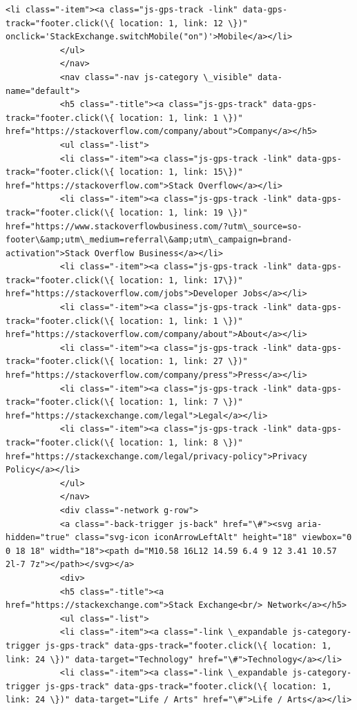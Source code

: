 \documentclass[11pt]{article}
\begin{document}
\begin{Verbatim}[commandchars=\\\{\}]
           <li class="-item"><a class="js-gps-track -link" data-gps-track="footer.click(\{ location: 1, link: 12 \})" onclick='StackExchange.switchMobile("on")'>Mobile</a></li>
           </ul>
           </nav>
           <nav class="-nav js-category \_visible" data-name="default">
           <h5 class="-title"><a class="js-gps-track" data-gps-track="footer.click(\{ location: 1, link: 1 \})" href="https://stackoverflow.com/company/about">Company</a></h5>
           <ul class="-list">
           <li class="-item"><a class="js-gps-track -link" data-gps-track="footer.click(\{ location: 1, link: 15\})" href="https://stackoverflow.com">Stack Overflow</a></li>
           <li class="-item"><a class="js-gps-track -link" data-gps-track="footer.click(\{ location: 1, link: 19 \})" href="https://www.stackoverflowbusiness.com/?utm\_source=so-footer\&amp;utm\_medium=referral\&amp;utm\_campaign=brand-activation">Stack Overflow Business</a></li>
           <li class="-item"><a class="js-gps-track -link" data-gps-track="footer.click(\{ location: 1, link: 17\})" href="https://stackoverflow.com/jobs">Developer Jobs</a></li>
           <li class="-item"><a class="js-gps-track -link" data-gps-track="footer.click(\{ location: 1, link: 1 \})" href="https://stackoverflow.com/company/about">About</a></li>
           <li class="-item"><a class="js-gps-track -link" data-gps-track="footer.click(\{ location: 1, link: 27 \})" href="https://stackoverflow.com/company/press">Press</a></li>
           <li class="-item"><a class="js-gps-track -link" data-gps-track="footer.click(\{ location: 1, link: 7 \})" href="https://stackexchange.com/legal">Legal</a></li>
           <li class="-item"><a class="js-gps-track -link" data-gps-track="footer.click(\{ location: 1, link: 8 \})" href="https://stackexchange.com/legal/privacy-policy">Privacy Policy</a></li>
           </ul>
           </nav>
           <div class="-network g-row">
           <a class="-back-trigger js-back" href="\#"><svg aria-hidden="true" class="svg-icon iconArrowLeftAlt" height="18" viewbox="0 0 18 18" width="18"><path d="M10.58 16L12 14.59 6.4 9 12 3.41 10.57 2l-7 7z"></path></svg></a>
           <div>
           <h5 class="-title"><a href="https://stackexchange.com">Stack Exchange<br/> Network</a></h5>
           <ul class="-list">
           <li class="-item"><a class="-link \_expandable js-category-trigger js-gps-track" data-gps-track="footer.click(\{ location: 1, link: 24 \})" data-target="Technology" href="\#">Technology</a></li>
           <li class="-item"><a class="-link \_expandable js-category-trigger js-gps-track" data-gps-track="footer.click(\{ location: 1, link: 24 \})" data-target="Life / Arts" href="\#">Life / Arts</a></li>

\end{Verbatim}
\end{document}
